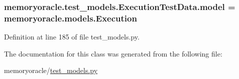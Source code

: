\subsubsection[{model}]{\setlength{\rightskip}{0pt plus 5cm}memoryoracle.\+test\+\_\+models.\+Execution\+Test\+Data.\+model = {\bf memoryoracle.\+models.\+Execution}\hspace{0.3cm}{\ttfamily [static]}}\label{classmemoryoracle_1_1test__models_1_1ExecutionTestData_a6e5285d5b3b3ff2443ec195959d31213}


Definition at line 185 of file test\+\_\+models.\+py.



The documentation for this class was generated from the following file\+:\begin{DoxyCompactItemize}
\item 
memoryoracle/\hyperlink{test__models_8py}{test\+\_\+models.\+py}\end{DoxyCompactItemize}

